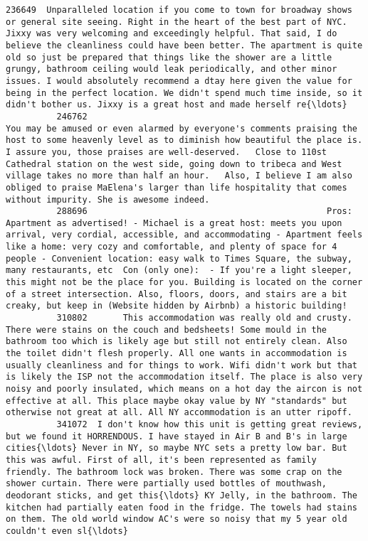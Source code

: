 \documentclass[11pt]{article}
\begin{document}
\begin{Verbatim}[commandchars=\\\{\}]
          236649  Unparalleled location if you come to town for broadway shows or general site seeing. Right in the heart of the best part of NYC. Jixxy was very welcoming and exceedingly helpful. That said, I do believe the cleanliness could have been better. The apartment is quite old so just be prepared that things like the shower are a little grungy, bathroom ceiling would leak periodically, and other minor issues. I would absolutely recommend a dtay here given the value for being in the perfect location. We didn't spend much time inside, so it didn't bother us. Jixxy is a great host and made herself re{\ldots}   
          246762                                                                                                                                                        You may be amused or even alarmed by everyone's comments praising the host to some heavenly level as to diminish how beautiful the place is. I assure you, those praises are well-deserved.   Close to 110st Cathedral station on the west side, going down to tribeca and West village takes no more than half an hour.   Also, I believe I am also obliged to praise MaElena's larger than life hospitality that comes without impurity. She is awesome indeed.   
          288696                                               Pros: Apartment as advertised! - Michael is a great host: meets you upon arrival, very cordial, accessible, and accommodating - Apartment feels like a home: very cozy and comfortable, and plenty of space for 4 people - Convenient location: easy walk to Times Square, the subway, many restaurants, etc  Con (only one):  - If you're a light sleeper, this might not be the place for you. Building is located on the corner of a street intersection. Also, floors, doors, and stairs are a bit creaky, but keep in (Website hidden by Airbnb) a historic building!   
          310802       This accommodation was really old and crusty. There were stains on the couch and bedsheets! Some mould in the bathroom too which is likely age but still not entirely clean. Also the toilet didn't flesh properly. All one wants in accommodation is usually cleanliness and for things to work. Wifi didn't work but that is likely the ISP not the accommodation itself. The place is also very noisy and poorly insulated, which means on a hot day the aircon is not effective at all. This place maybe okay value by NY "standards" but otherwise not great at all. All NY accommodation is an utter ripoff.   
          341072  I don't know how this unit is getting great reviews, but we found it HORRENDOUS. I have stayed in Air B and B's in large cities{\ldots} Never in NY, so maybe NYC sets a pretty low bar. But this was awful. First of all, it's been represented as family friendly. The bathroom lock was broken. There was some crap on the shower curtain. There were partially used bottles of mouthwash, deodorant sticks, and get this{\ldots} KY Jelly, in the bathroom. The kitchen had partially eaten food in the fridge. The towels had stains on them. The old world window AC's were so noisy that my 5 year old couldn't even sl{\ldots}   

\end{Verbatim}
\end{document}
